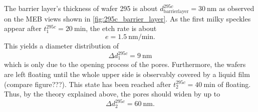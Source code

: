 \documentclass[thesis.tex]{subfiles}
\begin{document}
      

      The barrier layer's thickness of wafer 295 is about $d_\mathrm{barrierlayer}^{295c}=\SI{30}{\nano\meter} $ as observed on the MEB views shown in \cref{fig:295c_barrier_layer}. As the first milky speckles appear after $t_1^{295c}=\SI{20}{\minute} $, the etch rate is about
      \begin{equation}
          e = \SI{1,5}{\nano\meter\per\minute}. \label{eq:etch-rate}
      \end{equation}
      This yields a diameter distribution of
      \begin{equation}
          \Delta d_1^{295c} = \SI{9}{\nano\meter}
      \end{equation}
      which is only due to the opening process of the pores. Furthermore, the wafers are left floating until the whole upper side is observably covered by a liquid film (compare figure???). This state has been reached after $t_\mathrm{2}^{295c}=\SI{40}{\minute} $ of floating. Thus, by the theory explained above, the pores should widen by up to
      \begin{equation}
          \Delta d_2^{295c} =\SI{60}{\nano\meter}.
      \end{equation}
      \medskip
\end{document}
